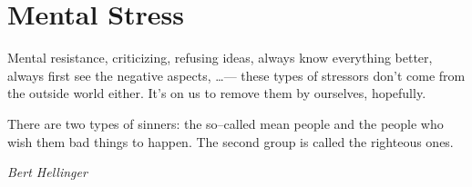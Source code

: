 \documentclass[../main.tex]{subfiles}
\begin{document}
  \section{Mental Stress}

  Mental resistance, criticizing, refusing ideas, always know everything better, always first see the negative aspects, \ldots ---
  these types of stressors don't come from the outside world either.
  It's on us to remove them by ourselves, hopefully.

  \epigraph{There are two types of sinners: the so--called mean people and the people who wish them bad things to happen. The second group is called the righteous ones.}{\textit{Bert Hellinger}}
\end{document}
